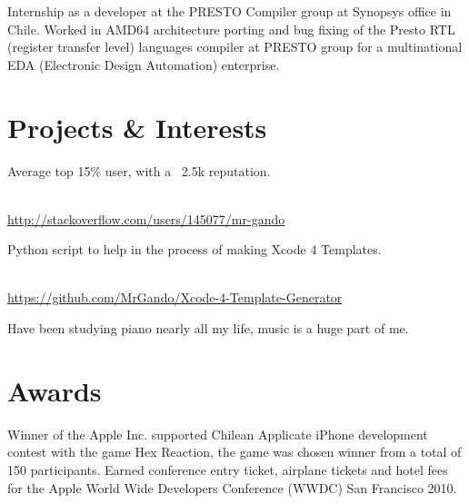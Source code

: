 \documentclass[10pt, a4paper, dvips]{moderncv}
\newcommand\Colorhref[1]{\small\textcolor{RoyalBlue}{\url{#1}}}
\begin{document}
{
\begin{scriptsize}
Internship as a developer at the PRESTO Compiler group at Synopsys office in Chile. Worked in AMD64 architecture porting and bug fixing of the Presto RTL (register transfer level) languages compiler at
PRESTO group for a multinational EDA (Electronic Design Automation) enterprise. \\
\end{scriptsize}
}

\section{Projects \& Interests}
{
\begin{small}Average top 15\% user, with a ~2.5k reputation.\end{small}\\
\Colorhref{http://stackoverflow.com/users/145077/mr-gando}\\
}
{
\begin{small}Python script to help in the process of making Xcode 4 Templates.\end{small}\\
\Colorhref{ https://github.com/MrGando/Xcode-4-Template-Generator}\\
}
{
Have been studying piano nearly all my life, music is a huge part of me.
}

\section{Awards}
{
\begin{scriptsize}
Winner of the Apple Inc. supported Chilean Applicate iPhone development contest with the game Hex Reaction, the game was chosen winner from a total of 150 participants. Earned conference entry ticket, airplane tickets and hotel fees for the Apple World Wide Developers Conference (WWDC) San Francisco 2010.\\
\end{scriptsize}
}
\end{document}
